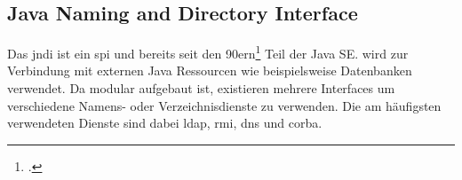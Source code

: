 
\subsection{Java Naming and Directory Interface}\label{subsec:jndi}
Das \gls{jndi} ist ein \gls{spi} und bereits seit den 90ern\footcite{jndiHackTricks} Teil der Java SE.
 wird zur Verbindung mit externen Java Ressourcen wie beispielsweise Datenbanken verwendet.
Da  modular aufgebaut ist, existieren mehrere Interfaces um verschiedene Namens- oder Verzeichnisdienste zu verwenden.
Die am häufigsten verwendeten Dienste sind dabei \gls{ldap}, \gls{rmi}, \gls{dns} und \gls{corba}.
